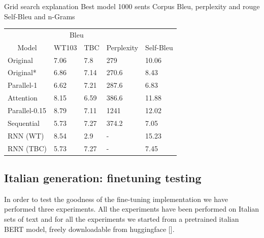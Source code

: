 \documentclass[10pt,twocolumn,letterpaper]{article}
\begin{document}
Grid search explanation
Best model 1000 sents
Corpus Bleu, perplexity and rouge
Self-Bleu and n-Grams
\begin{table}[]
\begin{tabular}{lllll}
\hline
\multicolumn{1}{c}{} & \multicolumn{2}{c}{Bleu} & \multicolumn{1}{c}{\multirow{}{}{}} & \multicolumn{1}{c}{} \\ \cline{2-3}
\multicolumn{1}{c}{\multirow{}{}{Model}}   & WT103       & TBC        & \multicolumn{1}{c}{\multirow{}{}{Perplexity}} & Self-Bleu  \\ \hline
Original \cite{wang2019bert}                & 7.06        & 7.8        & 279        & 10.06                                            \\
Original*                            & 6.86        & 7.14        & 270.6             & 8.43                                  \\
Parallel-1                                 & 6.62        & 7.21       & 287.6                    & 6.83                           \\
Attention                                 & 8.15        & 6.59       & 386.6                  &  11.88                          \\
Parallel-0.15                              & 8.79            & 7.11           & 1241         & 12.02                                       \\
Sequential                                & 5.73            & 7.27           & 374.2          & 7.05                                      \\
RNN (WT)                                & 8.54            & 2.9           & -                  & 15.23                              \\
RNN (TBC)                                & 5.73            & 7.27           & -                & 7.45                                \\ \hline
\end{tabular}
\end{table}


\subsection{Italian generation: finetuning testing}
In order to test the goodness of the fine-tuning implementation we have performed three experiments.
All the experiments have been performed on Italian sets of text and for all the experiments we started from a pretrained
italian BERT model, freely downloadable from huggingface [].
\end{document}
